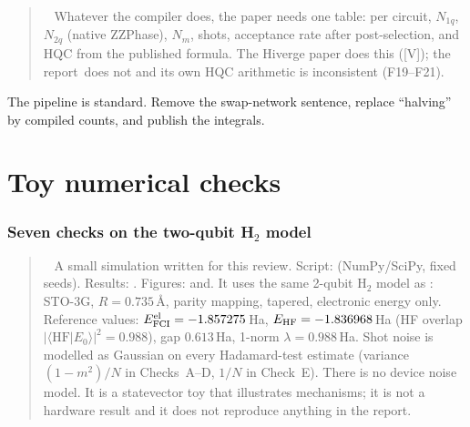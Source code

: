 \documentclass[11pt,a4paper]{article}
\newcommand{\braket}[2]{\langle #1\vert #2\rangle}
\newcommand{\report}{the report}
\newcommand{\lV}{\textcolor{keyblue}{[V]}}   %
\newenvironment{idea}[1][Main idea]{\par\smallskip\begin{quotation}\noindent{\bfseries\textcolor{keyblue}{#1.}}\ }{\end{quotation}\smallskip}
\newenvironment{caution}[1][Caution]{\par\smallskip\begin{quotation}\noindent{\bfseries\textcolor{alertred}{#1.}}\ }{\end{quotation}\smallskip}
\newcommand{\takeaway}[1]{\par\smallskip\noindent{\bfseries\textcolor{keyblue}{Takeaway.}} #1\par\smallskip}
\begin{document}
\begin{idea}[A per-circuit ledger]
Whatever the compiler does, the paper needs one table: per circuit, $N_{1q}$, $N_{2q}$ (native ZZPhase), $N_m$, shots, acceptance rate after post-selection, and HQC from the published formula. The Hiverge paper does this (\lV); \report\ does not and its own HQC arithmetic is inconsistent (F19--F21).
\end{idea}

\takeaway{The pipeline is standard. Remove the swap-network sentence, replace ``halving'' by compiled counts, and publish the integrals.}

\clearpage
\part{Toy numerical checks}

\section{Seven checks on the two-qubit H$_2$ model}\label{sec:numerics}
\begin{caution}[What this is and is not]
A small simulation written for this review.\newline
Script:  (NumPy/SciPy, fixed seeds).\newline
Results: \allowbreak{}.\newline
Figures:  and\newline {}.\newline
It uses the same 2-qubit H$_2$ model as : STO-3G, $R=0.735$\,\AA, parity mapping, tapered, electronic energy only. Reference values: $E_{\rm FCI}^{\rm el}=-1.857275$\,Ha, $E_{\rm HF}=-1.836968$\,Ha (HF overlap $|\braket{\mathrm{HF}}{E_0}|^2=0.988$), gap $0.613$\,Ha, 1-norm $\lambda=0.988$\,Ha. Shot noise is modelled as Gaussian on every Hadamard-test estimate (variance $(1-m^2)/N$ in Checks~A--D, $1/N$ in Check~E). There is no device noise model. It is a statevector toy that illustrates mechanisms; it is \alert{not} a hardware result and it does not reproduce anything in \report.
\end{caution}
\end{document}

